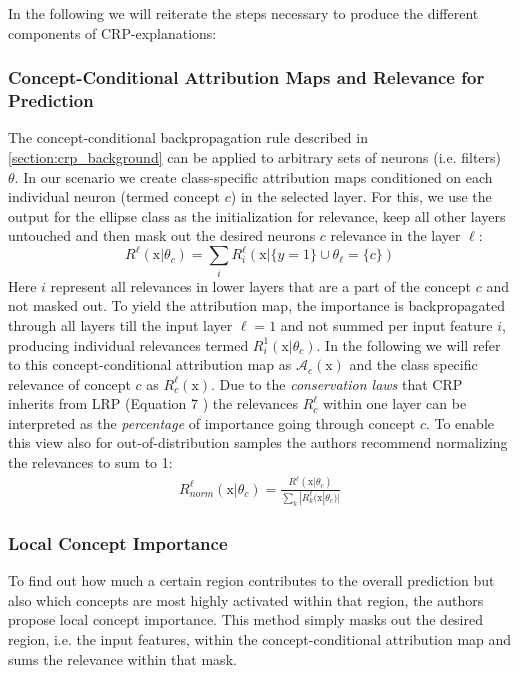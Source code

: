 In the following we will reiterate the steps necessary to produce the different components of CRP-explanations:

\subsubsection{Concept-Conditional Attribution Maps and Relevance for Prediction}
The concept-conditional backpropagation rule described in \cref{section:crp_background} can be applied to arbitrary sets of neurons (i.e. filters) $\theta$. In our scenario we create class-specific attribution maps conditioned on each individual neuron (termed concept $c$) in the selected layer. For this, we use the output for the ellipse class as the initialization for relevance, keep all other layers untouched and then mask out the desired neurons $c$ relevance in the layer $\ell$: 
\begin{equation}
    R^{\ell}(\mathrm{x} |\theta_{c}) = \sum_{i} R_i^{\ell}(\mathrm{x} |\{y=1\} \cup \theta_{\ell} = \{c\})
\end{equation}
Here $i$ represent all relevances in lower layers that are a part of the concept $c$ and not masked out. 
To yield the attribution map, the importance is backpropagated through all layers till the input layer $\ell = 1$ and not summed per input feature $i$, producing individual relevances  termed $R_{i}^{1}(\mathrm{x} |\theta_{c})$. In the following we will refer to this concept-conditional attribution map as $\mathcal{A}_c(\mathrm{x})$ and the class specific relevance of concept $c$ as $R_c^{\ell}(\mathrm{x})$. Due to the \textit{conservation laws} that CRP inherits from LRP (Equation 7 \cite{Achtibat2022}) the relevances $R_c^{\ell}$ within one layer can be interpreted as the \textit{percentage} of importance going through concept $c$. To enable this view also for out-of-distribution samples the authors recommend normalizing the relevances to sum to 1:
\begin{align}
    R^{\ell}_{norm}(\mathrm{x} |\theta_{c}) = \frac{R^{\ell}(\mathrm{x} |\theta_{c}) }{\sum_k |R_k^{\ell}(\mathrm{x} |\theta_{c})|}
\end{align}

\subsubsection{Local Concept Importance}
To find out how much a certain region contributes to the overall prediction but also which concepts are most highly activated within that region, the authors propose local concept importance. 
This method simply masks out the desired region, i.e. the input features, within the concept-conditional attribution map and sums the relevance within that mask. 

